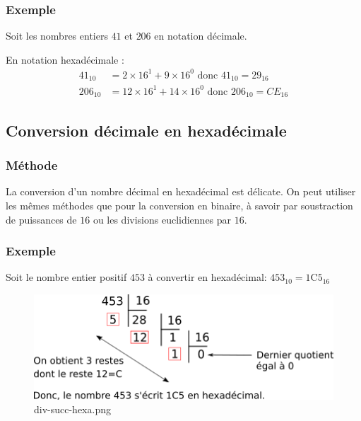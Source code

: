 \documentclass[11pt]{article}
\begin{document}
\hypertarget{exemple}{%
\subsubsection*{Exemple}\label{exemple}}

Soit les nombres entiers \(41\) et \(206\) en notation décimale.

En notation hexadécimale : \begin{align*}
41_{10} &= 2 \times 16^{1} + 9 \times 16^{0} \text{  donc  } 41_{10} = 29_{16}\\
206_{10} &= 12 \times 16^{1} + 14 \times 16^{0} \text{  donc  } 206_{10} = CE_{16}
\end{align*}

    \hypertarget{conversion-duxe9cimale-en-hexaduxe9cimale}{%
\subsection{Conversion décimale en
hexadécimale}\label{conversion-duxe9cimale-en-hexaduxe9cimale}}

\hypertarget{muxe9thode}{%
\subsubsection*{Méthode}\label{muxe9thode}}

La conversion d'un nombre décimal en hexadécimal est délicate. On peut
utiliser les mêmes méthodes que pour la conversion en binaire, à savoir
par soustraction de puissances de \(16\) ou les divisions euclidiennes
par \(16\).

\hypertarget{exemple}{%
\subsubsection*{Exemple}\label{exemple}}

Soit le nombre entier positif \(453\) à convertir en hexadécimal:
\(453_{10}=1\)C\(5_{16}\)

\begin{figure}
\centering
\includegraphics{img/div-succ-hexa.png}
\caption{div-succ-hexa.png}
\end{figure}
\end{document}
